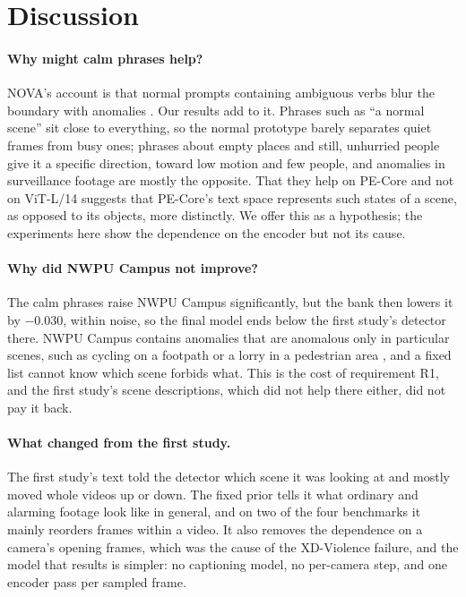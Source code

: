 \documentclass[a4paper,fleqn]{cas-sc}
\begin{document}
\section{Discussion}
\label{sec:discussion}

\paragraph{Why might calm phrases help?} NOVA's account is that normal prompts
containing ambiguous verbs blur the boundary with anomalies \citep{yin2026nova}. Our
results add to it. Phrases such as ``a normal scene'' sit close to everything, so the
normal prototype barely separates quiet frames from busy ones; phrases about empty
places and still, unhurried people give it a specific direction, toward low motion and
few people, and anomalies in surveillance footage are mostly the opposite. That they help on PE-Core and not on ViT-L/14 suggests
that PE-Core's text space represents such states of a scene, as opposed to its
objects, more distinctly. We offer this as a hypothesis; the experiments here show the
dependence on the encoder but not its cause.

\paragraph{Why did NWPU Campus not improve?} The calm phrases raise NWPU Campus
significantly, but the bank then lowers it by $-0.030$, within noise, so the final
model ends below the first study's detector there. NWPU Campus contains anomalies that
are anomalous only in particular scenes, such as cycling on a footpath or a lorry in a
pedestrian area \citep{cao2023nwpu}, and a fixed list cannot know which scene forbids
what. This is the cost of requirement R1, and the first study's scene descriptions,
which did not help there either, did not pay it back.

\paragraph{What changed from the first study.} The first study's text told the
detector which scene it was looking at and mostly moved whole videos up or down. The
fixed prior tells it what ordinary and alarming footage look like in general, and on
two of the four benchmarks it mainly reorders frames within a video. It also removes the dependence on a camera's
opening frames, which was the cause of the XD-Violence failure, and the model that
results is simpler: no captioning model, no per-camera step, and one encoder pass per
sampled frame.
\end{document}
